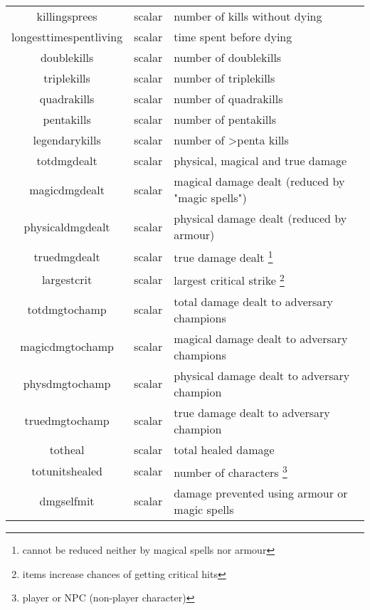 \begin{longtable}{|c|c|l|}
        killingsprees               & scalar          & number of kills without dying\\
        longesttimespentliving      & scalar          & time spent before dying\\
        doublekills                 & scalar          & number of doublekills\\
        triplekills                 & scalar          & number of triplekills\\
        quadrakills                 & scalar          & number of quadrakills\\
        pentakills                  & scalar          & number of pentakills\\
        legendarykills              & scalar          & number of >penta kills \\
        totdmgdealt                 & scalar          & physical, magical and true damage\\
        magicdmgdealt               & scalar          & magical damage dealt (reduced by "magic spells")\\
        physicaldmgdealt            & scalar          & physical damage dealt (reduced by armour)\\
        truedmgdealt                & scalar          & true damage dealt \footnote{cannot be reduced neither by magical spells nor armour}\\
        largestcrit                 & scalar		  & largest critical strike \footnote{items increase chances of getting critical hits}\\
        totdmgtochamp               & scalar          & total damage dealt to adversary champions\\
        magicdmgtochamp             & scalar          & magical damage dealt to adversary champions\\
        physdmgtochamp              & scalar          & physical damage dealt to adversary champion\\
        truedmgtochamp              & scalar          & true damage dealt to adversary champion\\
        totheal                     & scalar          & total healed damage\\
        totunitshealed              & scalar          & number of characters \footnote{player or NPC (non-player character)}\\
        dmgselfmit                  & scalar          & damage prevented using armour or magic spells\\

\end{longtable}

